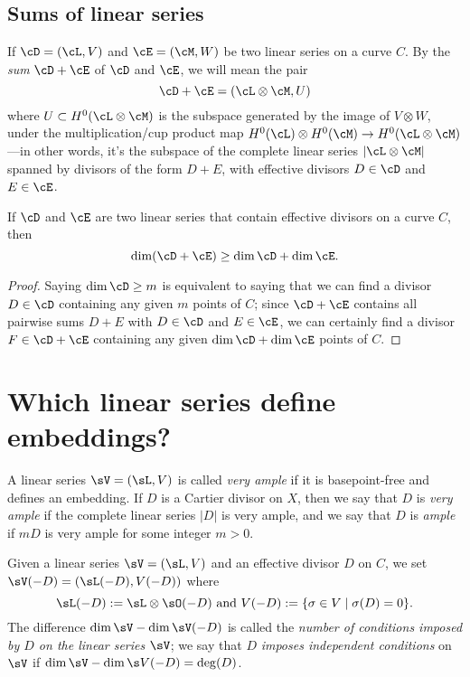 \subsection{Sums of linear series}
If
$\cD = (\cL,V)$ and $\cE = (\cM, W)$ be two linear series on a curve $C$. By the \emph{sum} $\cD + \cE$ of $\cD$ and $\cE$, we will mean the pair 
$$
\cD + \cE = (\cL \otimes \cM, U) 
$$
where $U \subset H^0(\cL \otimes \cM)$ is the subspace generated by the image of $V \otimes W$, under the multiplication/cup product map $H^0(\cL) \otimes H^0(\cM) \to H^0(\cL \otimes \cM)$---in other words, it's the subspace of the complete linear series $|\cL\otimes \cM|$ spanned by divisors of the form $D+E$, with effective divisors $D \in \cD$ and $E \in \cE$.
 
 
\begin{proposition}\label{sum of linear series}
 If $\cD$ and $\cE$ are two  linear series that contain effective divisors on a curve $C$, then
$$
\dim(\cD + \cE) \geq \dim \cD + \dim \cE.
$$
\end{proposition}
\begin{proof}
Saying $\dim \cD \geq m$ is equivalent to saying that we can find a divisor $D \in \cD$ containing any given $m$ points of $C$; since $\cD + \cE$ contains all pairwise sums $D + E$ with $D \in \cD$ and $E \in \cE$, we can certainly find a divisor $F \in \cD + \cE$ containing any given $\dim \cD + \dim \cE$ points of $C$.
\end{proof}

\section{Which linear series define embeddings?}

A linear series $\sV = (\sL, V)$ is called  \emph{very ample}  if it is basepoint-free and defines an embedding. If $D$ is a Cartier divisor on $X$, then we say that $D$ is \emph{very ample} if the complete linear series $|D|$ is very ample, and we say that $D$ is \emph{ample} if $mD$ is very ample for some integer $m>0$.

Given a linear series $\sV = (\sL, V)$ and an effective divisor $D$ on $C$, we  set
$
\sV(-D) = (\sL(-D),V(-D))
$
where
$$
\sL(-D): = \sL \otimes \sO(-D)\hbox{ and } V(-D) := \{ \sigma \in V \mid \sigma(D) = 0 \}.
$$
The difference $\dim \sV - \dim \sV(-D)$ is called the \emph{number of conditions imposed by $D$ on the linear series $\sV$}; we say that $D$ \emph{imposes independent conditions} on $\sV$ if $\dim \sV - \dim \s V(-D) = \deg(D)$.

